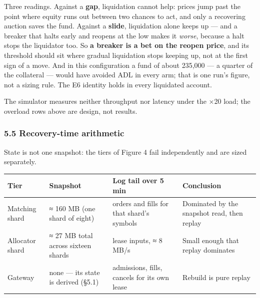 \documentclass[10pt,a4paper]{article}
\newcounter{none}  %
\begin{document}
Three readings. Against a \textbf{gap}, liquidation cannot help: prices jump past the
point where equity runs out between two chances to act, and only a recovering
auction saves the fund. Against a \textbf{slide}, liquidation alone keeps up --- and a
breaker that halts early and reopens at the low makes it \emph{worse}, because a halt
stops the liquidator too. So \textbf{a breaker is a bet on the reopen price}, and its
threshold should sit where gradual liquidation stops keeping up, not at the first
sign of a move. And in this configuration a fund of about 235,000 --- a quarter of
the collateral --- would have avoided ADL in every arm; that is one run's figure,
not a sizing rule. The E6 identity holds in every liquidated account.

The simulator measures neither throughput nor latency under the ×20 load; the
overload rows above are design, not results.

\subsubsection{5.5 Recovery-time arithmetic}\label{recovery-time-arithmetic}

State is not one snapshot: the tiers of Figure 4 fail independently and are
sized separately.

{\def\LTcaptype{none} %
\begin{longtable}[]{@{}
  >{\raggedright\arraybackslash}p{}
  >{\raggedright\arraybackslash}p{}
  >{\raggedright\arraybackslash}p{}
  >{\raggedright\arraybackslash}p{}@{}}
\toprule\noalign{}
\begin{minipage}[b]{\linewidth}\raggedright
Tier
\end{minipage} & \begin{minipage}[b]{\linewidth}\raggedright
Snapshot
\end{minipage} & \begin{minipage}[b]{\linewidth}\raggedright
Log tail over 5 min
\end{minipage} & \begin{minipage}[b]{\linewidth}\raggedright
Conclusion
\end{minipage} \\
\midrule\noalign{}
\endhead
\bottomrule\noalign{}
\endlastfoot
Matching shard & ≈ 160 MB (one shard of eight) & orders and fills for that shard's symbols & Dominated by the snapshot read, then replay \\
Allocator shard & ≈ 27 MB total across sixteen shards & lease inputs, ≈ 8 MB/s & Small enough that replay dominates \\
Gateway & none --- its state is derived (§5.1) & admissions, fills, cancels for its own lease & Rebuild is pure replay \\
\end{longtable}
}
\end{document}
